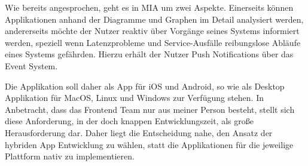 Wie bereits angesprochen, geht es in MIA um zwei Aspekte. Einerseits können Applikationen anhand der Diagramme und Graphen im Detail analysiert werden,
andererseits möchte der Nutzer reaktiv über Vorgänge seines Systems informiert werden, speziell wenn Latenzprobleme und Service-Ausfälle reibungslose Abläufe eines Systems gefährden.
Hierzu erhält der Nutzer Push Notifications über das Event System.

Die Applikation soll daher als App für iOS und Android, so wie als Desktop Applikation für MacOS, Linux und Windows zur Verfügung stehen.
In Anbetracht, dass das Frontend Team nur aus meiner Person besteht, stellt sich diese Anforderung, in der doch knappen Entwicklungszeit, als große Herausforderung dar.
Daher liegt die Entscheidung nahe, den Ansatz der hybriden App Entwicklung zu wählen, statt die Applikationen für die jeweilige Plattform nativ zu implementieren.
